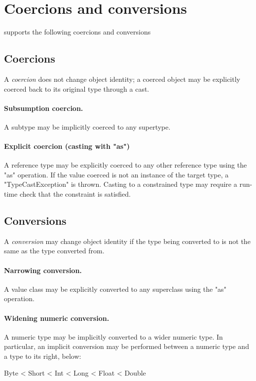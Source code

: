 \section{Coercions and conversions}
\label{XtenConversions}

\XtenCurrVer{} supports the following coercions and conversions

\subsection{Coercions}

A {\em coercion} does not change object identity;
a coerced object may be explicitly coerced back to its original
type through a cast.

\paragraph{Subsumption coercion.}
A subtype may be implicitly coerced to any supertype.

\paragraph{Explicit coercion (casting with \xcd"as")}
A reference type may be explicitly coerced to any other
reference type using the \xcd"as" operation.
If the value coerced is not an instance of the target type,
a \xcd"TypeCastException" is thrown.  Casting to a constrained
type may require a run-time check that the constraint is
satisfied.

\subsection{Conversions}

A {\em conversion} may change object identity if the type being
converted to is not the same as the type converted from.

\paragraph{Narrowing conversion.}
A value class may be explicitly converted to any superclass
using the \xcd"as" operation.


\paragraph{Widening numeric conversion.}
A numeric type may be implicitly converted to a wider
numeric type.
In particular, an implicit conversion may be performed between
a numeric type and a type to its right, below:
\begin{xten}
Byte < Short < Int < Long < Float < Double
\end{xten}

